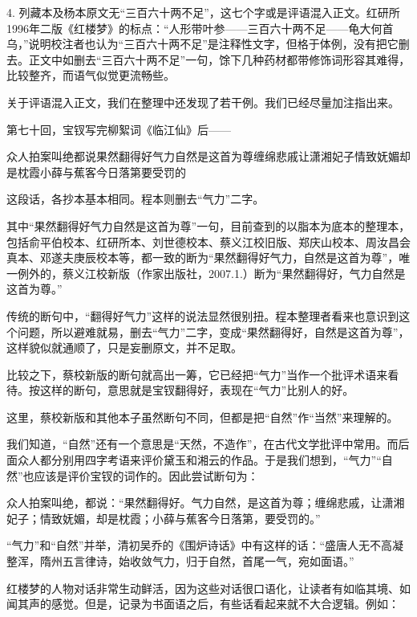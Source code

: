 4.
列藏本及杨本原文无“三百六十两不足”，这七个字或是评语混入正文。红研所1996年二版《红楼梦》的标点：“人形带叶参------三百六十两不足------龟大何首乌，”说明校注者也认为“三百六十两不足”是注释性文字，但格于体例，没有把它删去。正文中如删去“三百六十两不足”一句，馀下几种药材都带修饰词形容其难得，比较整齐，而语气似觉更流畅些。

关于评语混入正文，我们在整理中还发现了若干例。我们已经尽量加注指出来。

{{}}

第七十回，宝钗写完柳絮词《临江仙》后------

众人拍案叫绝都说果然翻得好气力自然是这首为尊缠绵悲戚让潇湘妃子情致妩媚却是枕霞小薛与蕉客今日落第要受罚的

这段话，各抄本基本相同。程本则删去“气力”二字。

其中“果然翻得好气力自然是这首为尊”一句，目前查到的以脂本为底本的整理本，包括俞平伯校本、红研所本、刘世德校本、蔡义江校旧版、郑庆山校本、周汝昌会真本、邓遂夫庚辰校本等，都一致的断为“果然翻得好气力，自然是这首为尊”，唯一例外的，蔡义江校新版（作家出版社，2007.1.）断为“果然翻得好，气力自然是这首为尊。”

传统的断句中，“翻得好气力”这样的说法显然很别扭。程本整理者看来也意识到这个问题，所以避难就易，删去“气力”二字，变成“果然翻得好，自然是这首为尊”，这样貌似就通顺了，只是妄删原文，并不足取。

比较之下，蔡校新版的断句就高出一筹，它已经把“气力”当作一个批评术语来看待。按这样的断句，意思就是宝钗翻得好，表现在“气力”比别人的好。

这里，蔡校新版和其他本子虽然断句不同，但都是把“自然”作“当然”来理解的。

我们知道，“自然”还有一个意思是“天然，不造作”，在古代文学批评中常用。而后面众人都分别用四字考语来评价黛玉和湘云的作品。于是我们想到，“气力”“自然”也应该是评价宝钗的词作的。因此尝试断句为：

众人拍案叫绝，都说：“果然翻得好。气力自然，是这首为尊；缠绵悲戚，让潇湘妃子；情致妩媚，却是枕霞；小薛与蕉客今日落第，要受罚的。”

“气力”和“自然”并举，清初吴乔的《围炉诗话》中有这样的话：“盛唐人无不高凝整浑，隋州五言律诗，始收敛气力，归于自然，首尾一气，宛如面语。”

{{}}

红楼梦的人物对话非常生动鲜活，因为这些对话很口语化，让读者有如临其境、如闻其声的感觉。但是，记录为书面语之后，有些话看起来就不大合逻辑。例如：

